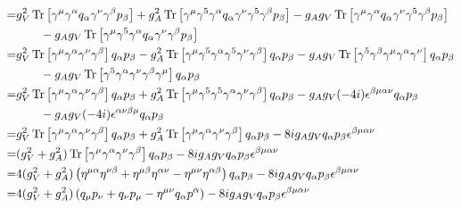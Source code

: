 \documentclass[12pt,a4]{article}
\begin{document}
\begin{enumerate}
\begin{enumerate}
\begin{align*}
                      =& g_V^2 \Tr\left[\gamma^\mu  \gamma^\alpha q_\alpha \gamma^\nu \gamma^\beta p_\beta \right] + g_A^2 \Tr\left[\gamma^\mu \gamma^5 \gamma^\alpha q_\alpha \gamma^\nu \gamma^5 \gamma^\beta p_\beta \right] -  g_A g_V\Tr\left[\gamma^\mu \gamma^\alpha q_\alpha \gamma^\nu  \gamma^5 \gamma^\beta p_\beta \right]\\
                       & \qquad -  g_A g_V\Tr\left[\gamma^\mu \gamma^5 \gamma^\alpha q_\alpha \gamma^\nu  \gamma^\beta p_\beta \right]\\
                      =& g_V^2 \Tr\left[\gamma^\mu  \gamma^\alpha \gamma^\nu \gamma^\beta \right]q_\alpha p_\beta - g_A^2 \Tr\left[\gamma^\mu \gamma^5 \gamma^\alpha \gamma^5\gamma^\nu \gamma^\beta  \right]q_\alpha  p_\beta-  g_A g_V\Tr\left[\gamma^5 \gamma^\beta \gamma^\mu \gamma^\alpha \gamma^\nu   \right]q_\alpha p_\beta\\
                       & \qquad -  g_A g_V\Tr\left[\gamma^5 \gamma^\alpha \gamma^\nu  \gamma^\beta \gamma^\mu \right]q_\alpha p_\beta \\
                      =& g_V^2 \Tr\left[\gamma^\mu  \gamma^\alpha \gamma^\nu \gamma^\beta \right]q_\alpha p_\beta + g_A^2 \Tr\left[\gamma^\mu \gamma^5 \gamma^5 \gamma^\alpha \gamma^\nu  \gamma^\beta  \right]q_\alpha  p_\beta-  g_A g_V(-4 i)\epsilon^{\beta \mu \alpha \nu} q_\alpha p_\beta\\
                       & \qquad -  g_A g_V (-4 i)\epsilon^{\alpha \nu\beta \mu } q_\alpha p_\beta \\
                      =& g_V^2 \Tr\left[\gamma^\mu  \gamma^\alpha \gamma^\nu \gamma^\beta \right]q_\alpha p_\beta + g_A^2 \Tr\left[\gamma^\mu \gamma^\alpha \gamma^\nu \gamma^\beta  \right]q_\alpha  p_\beta - 8 i g_A g_V q_\alpha p_\beta \epsilon^{\beta \mu \alpha \nu} \\
                      =& (g_V^2 + g_A^2)\Tr\left[\gamma^\mu  \gamma^\alpha \gamma^\nu \gamma^\beta \right]q_\alpha p_\beta  - 8 i g_A g_V q_\alpha p_\beta \epsilon^{\beta \mu \alpha \nu} \\
                      =& 4 (g_V^2 + g_A^2)\left(\eta^{\mu \alpha} \eta^{\nu \beta} + \eta^{\mu\beta}  \eta^{\alpha \nu} - \eta^{\mu\nu}  \eta^{\alpha\beta}\right) q_\alpha p_\beta  - 8 i g_A g_V q_\alpha p_\beta \epsilon^{\beta \mu \alpha \nu} \\
                      =& 4 (g_V^2 + g_A^2)\left( q_\mu p_\nu +  q_\nu p_\mu - \eta^{\mu\nu}  q_\alpha p^\alpha\right)   - 8 i g_A g_V q_\alpha p_\beta \epsilon^{\beta \mu \alpha \nu} \\

\end{align*}
\end{enumerate}
\end{enumerate}
\end{document}
